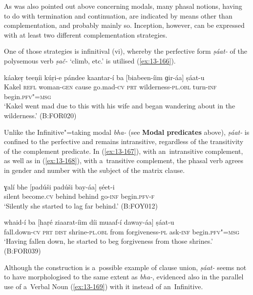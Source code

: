  As was also pointed out above concerning modals, many phasal notions, having to do with termination and continuation, are indicated by means other than complementation, and probably mainly so. Inception, however, can be expressed with at least two different complementation strategies.


One of those strategies is infinitival (vi), whereby the perfective form \textit{ṣáat-} of the polysemous verb \textit{ṣač-} `climb, etc.' is utilised (\ref{ex:13-166}). 

\begin{exe}
\ex
\label{ex:13-166}
\gll káakeṛ teeṇíi kúṛi-e pándee kaantar-í ba  [biabeen-íim ɡir-áa] ṣáat-u \\
Kakel \textsc{ refl} woman-\textsc{gen} cause go.mad-\textsc{cv} \textsc{prt}  wilderness-\textsc{pl.obl} turn-\textsc{inf} begin.\textsc{pfv"=msg} \\
\glt `Kakel went mad due to this with his wife and began wandering about in the wilderness.' (B:FOR020) 
\end{exe}

Unlike the Infinitive"=taking modal \textit{bha-} (see \textbf{Modal predicates} above), \textit{ṣáat-} is confined to the perfective and remains intransitive, regardless of the transitivity of the complement predicate. In (\ref{ex:13-167}), with an~intransitive complement, as well as in (\ref{ex:13-168}), with a~transitive complement, the phasal verb agrees in gender and number with the subject of the matrix clause.

\begin{exe}
\ex
\label{ex:13-167}
\gll ɣalí bhe [padúši padúši bay-áa] ṣéet-i  \\
silent become.\textsc{cv} behind behind go-\textsc{inf} begin.\textsc{pfv-f} \\
\glt `Silently she started to lag far behind.' (B:FOY012)

\ex
\label{ex:13-168}
\gll whaid-í ba [haṛé ziaarat-íim díi  muaaf-í daway-áa] ṣáat-u \\
fall.down-\textsc{cv} \textsc{prt} \textsc{dist} shrine-\textsc{pl.obl} from forgiveness-\textsc{pl} ask-\textsc{inf} begin.\textsc{pfv"=msg}  \\
\glt `Having fallen down, he started to beg forgiveness from those shrines.' (B:FOR039) 
\end{exe}

Although the construction is a~possible example of clause union, \textit{ṣáat-} seems not to have morphologised to the same extent as \textit{bha-}, evidenced also in the parallel use of a~Verbal Noun (\ref{ex:13-169}) with it instead of an~Infinitive. 

